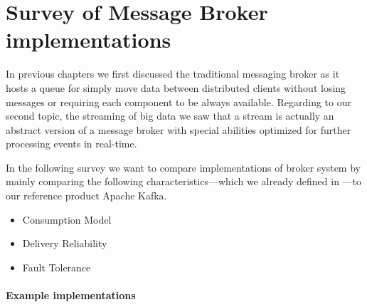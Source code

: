 \chapter{Survey of Message Broker implementations} 
\label{survey-broker}
In previous chapters we first discussed the traditional messaging broker as it
hosts a queue for simply move data between distributed clients without losing
messages or requiring each component to be always available. Regarding to our
second topic, the streaming of big data we saw that a stream is actually an
abstract version of a message broker with special abilities optimized for
further processing events in real-time. 

In the following survey we want to compare implementations of broker system by
mainly comparing the following characteristics---which we already defined in
---to our reference product Apache Kafka. 

\begin{itemize}
\item Consumption Model 
     \item Delivery Reliability 
         \item Fault Tolerance
\end{itemize}

\subsubsection{Example implementations}

